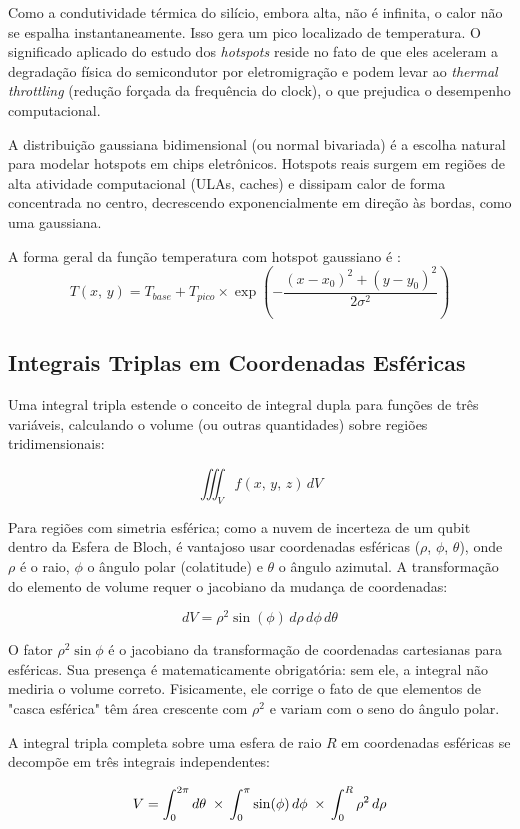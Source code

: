 Como a condutividade térmica do silício, embora alta, não é infinita, o calor não se espalha instantaneamente. Isso gera um pico localizado de temperatura. O significado aplicado do estudo dos \textit{hotspots} reside no fato de que eles aceleram a degradação física do semicondutor por eletromigração e podem levar ao \textit{thermal throttling} (redução forçada da frequência do clock), o que prejudica o desempenho computacional.

A distribuição gaussiana bidimensional (ou normal bivariada) é a escolha natural para modelar hotspots em chips eletrônicos. Hotspots reais surgem em regiões de alta atividade computacional (ULAs, caches) e dissipam calor de forma concentrada no centro, decrescendo exponencialmente em direção às bordas, como uma gaussiana.

A forma geral da função temperatura com hotspot gaussiano é \cite{thermalmodeling}:
$$ T(x,\,y) = T_{base} + T_{pico}\times \exp\left(-\frac{(x-x_0)^2 + (y-y_0)^2}{2\sigma^2}\right) $$

\newpage
\subsection{Integrais Triplas em Coordenadas Esféricas}
Uma integral tripla estende o conceito de integral dupla para funções de três variáveis, calculando o volume (ou outras quantidades) sobre regiões tridimensionais:

$$ \iiint_V f(x,\,y,\,z)\, dV $$

Para regiões com simetria esférica; como a nuvem de incerteza de um qubit dentro da Esfera de Bloch, é vantajoso usar coordenadas esféricas ($\rho$, $\phi$, $\theta$), onde $\rho$ é o raio, $\phi$ o ângulo polar (colatitude) e $\theta$ o ângulo azimutal. A transformação do elemento de volume requer o jacobiano da mudança de coordenadas:

$$ dV=\rho^2\sin(\phi)\,d\rho\,d\phi\,d\theta $$

O fator $\rho^2\sin\phi$ é o jacobiano da transformação de coordenadas cartesianas para esféricas. Sua presença é matematicamente obrigatória: sem ele, a integral não mediria o volume correto. Fisicamente, ele corrige o fato de que elementos de "casca esférica" têm área crescente com $\rho^2$ e variam com o seno do ângulo polar.

A integral tripla completa sobre uma esfera de raio $R$ em coordenadas esféricas se decompõe em três integrais independentes:

$$
    V = \int_{0}^{2\pi} d\theta\;\times\; \\
    \int_{0}^{\pi} \sin(\phi)\, d\phi\;\times\; \\
    \int_{0}^{R} \rho^2\, d\rho
$$

